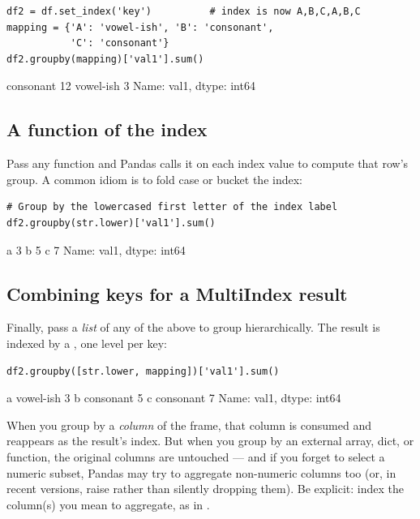 \documentclass[11pt]{article}
\begin{document}
\begin{lstlisting}
df2 = df.set_index('key')          # index is now A,B,C,A,B,C
mapping = {'A': 'vowel-ish', 'B': 'consonant',
           'C': 'consonant'}
df2.groupby(mapping)['val1'].sum()
\end{lstlisting}

\begin{outblock}
consonant    12
vowel-ish     3
Name: val1, dtype: int64
\end{outblock}

\subsection{A function of the index}

Pass any function and Pandas calls it on each index value to compute that row's group. A common idiom is to fold case or bucket the index:

\begin{lstlisting}
# Group by the lowercased first letter of the index label
df2.groupby(str.lower)['val1'].sum()
\end{lstlisting}

\begin{outblock}
a    3
b    5
c    7
Name: val1, dtype: int64
\end{outblock}

\subsection{Combining keys for a MultiIndex result}

Finally, pass a \emph{list} of any of the above to group hierarchically. The result is indexed by a , one level per key:

\begin{lstlisting}
df2.groupby([str.lower, mapping])['val1'].sum()
\end{lstlisting}

\begin{outblock}
a  vowel-ish    3
b  consonant    5
c  consonant    7
Name: val1, dtype: int64
\end{outblock}

\begin{pitfall}
When you group by a \emph{column} of the frame, that column is consumed and reappears as the result's index. But when you group by an external array, dict, or function, the original columns are untouched --- and if you forget to select a numeric subset, Pandas may try to aggregate non-numeric columns too (or, in recent versions, raise rather than silently dropping them). Be explicit: index the column(s) you mean to aggregate, as in .
\end{pitfall}
\end{document}
